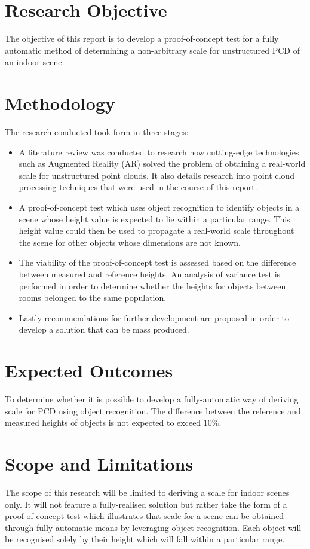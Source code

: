\section{Research Objective}
The objective of this report is to develop a proof-of-concept test for a fully automatic method of determining a non-arbitrary scale for unstructured PCD of an indoor scene. 

\section{Methodology}
The research conducted took form in three stages:
\begin{itemize}
	\item A literature review was conducted to research how cutting-edge technologies such as Augmented Reality (AR) solved the problem of obtaining a real-world scale for unstructured point clouds. It also details research into point cloud processing techniques that were used in the course of this report. 
	\item A proof-of-concept test which uses object recognition to identify objects in a scene whose height value is expected to lie within a particular range. This height value could then be used to propagate a real-world scale throughout the scene for other objects whose dimensions are not known.
	\item The viability of the proof-of-concept test is assessed based on the difference between measured and reference heights. An analysis of variance test is performed in order to determine whether the heights for objects between rooms belonged to the same population. 
	\item Lastly recommendations for further development are proposed in order to develop a solution that can be mass produced.
\end{itemize}

\section{Expected Outcomes}
\vspace{-3mm}
To determine whether it is possible to develop a fully-automatic way of deriving scale for PCD using object recognition. The difference between the reference and measured heights of objects is not expected to exceed $10\%$.
\vspace{-3mm}
\section{Scope and Limitations}
\vspace{-3mm}
The scope of this research will be limited to deriving a scale for indoor scenes only. It will not feature a fully-realised solution but rather take the form of a proof-of-concept test which illustrates that scale for a scene can be obtained through fully-automatic means by leveraging object recognition. Each object will be recognised solely by their height which will fall within a particular range.
\vspace{-3mm}
